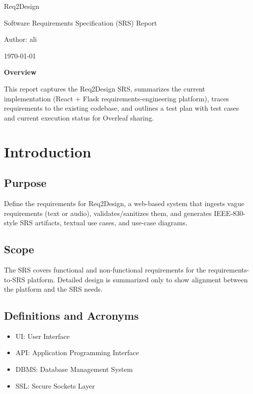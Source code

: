\documentclass[11pt]{article}
\begin{document}
\begin{titlepage}
  \centering
  {\LARGE Req2Design \par}
  \vspace{0.5cm}
  {\Large Software Requirements Specification (SRS) Report\par}
  \vspace{1cm}
  {\large Author: ali \par}
  \vfill
  {\large \today\par}
  \vspace{2cm}
  \textbf{Overview}\par
  This report captures the Req2Design SRS, summarizes the current implementation (React + Flask requirements-engineering platform), traces requirements to the existing codebase, and outlines a test plan with test cases and current execution status for Overleaf sharing.
\end{titlepage}

\tableofcontents
\newpage

\section{Introduction}
\subsection{Purpose}
Define the requirements for Req2Design, a web-based system that ingests vague requirements (text or audio), validates/sanitizes them, and generates IEEE-830-style SRS artifacts, textual use cases, and use-case diagrams.

\subsection{Scope}
The SRS covers functional and non-functional requirements for the requirements-to-SRS platform. Detailed design is summarized only to show alignment between the platform and the SRS needs.

\subsection{Definitions and Acronyms}
\begin{itemize}
  \item UI: User Interface
  \item API: Application Programming Interface
  \item DBMS: Database Management System
  \item SSL: Secure Sockets Layer
\end{itemize}
\end{document}
